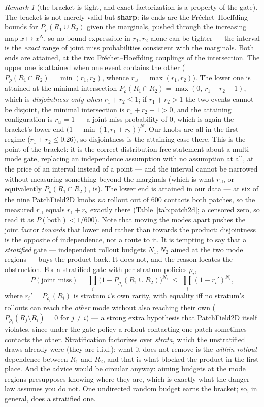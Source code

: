 \documentclass[11pt]{article}
\theoremstyle{definition}
\theoremstyle{remark}
\newtheorem{remark}{Remark}
\begin{document}
\begin{remark}[the bracket is tight, and exact factorization is a property of the gate]
\label{rem:bracket}
The bracket is not merely valid but \textbf{sharp}: its ends are the Fr\'echet--Hoeffding bounds for $P_\rho(R_1 \cup R_2)$ given the marginals, pushed through the increasing map $x \mapsto x^N$, so no bound expressible in $r_1, r_2$ alone can be tighter --- the interval is the \emph{exact} range of joint miss probabilities consistent with the marginals. Both ends are attained, at the two Fr\'echet--Hoeffding couplings of the intersection. The upper one is attained when one event contains the other ($P_\rho(R_1 \cap R_2) = \min(r_1,r_2)$, whence $r_\cup = \max(r_1,r_2)$). The lower one is attained at the minimal intersection $P_\rho(R_1 \cap R_2) = \max(0,\, r_1 + r_2 - 1)$, which is \emph{disjointness only when $r_1 + r_2 \leq 1$}; if $r_1 + r_2 > 1$ the two events cannot be disjoint, the minimal intersection is $r_1 + r_2 - 1 > 0$, and the attaining configuration is $r_\cup = 1$ --- a joint miss probability of $0$, which is again the bracket's lower end $\bigl(1-\min(1, r_1+r_2)\bigr)^N$. Our knobs are all in the first regime ($r_1 + r_2 \leq 0.26$), so disjointness is the attaining case there. This is the point of the bracket: it is the correct distribution-free statement about a multi-mode gate, replacing an independence assumption with no assumption at all, at the price of an interval instead of a point --- and the interval cannot be narrowed without measuring something beyond the marginals (which is what $r_\cup$, or equivalently $P_\rho(R_1 \cap R_2)$, is). The lower end is attained in our data --- at six of the nine PatchField2D knobs \emph{no} rollout out of 600 contacts both patches, so the measured $r_\cup$ equals $r_1 + r_2$ exactly there (Table~\ref{tab:patch2d}; a censored zero, so read it as $P(\text{both}) < 1/600$). Note that moving the modes apart pushes the joint factor \emph{towards} that lower end rather than towards the product: disjointness is the opposite of independence, not a route to it. It is tempting to say that a \emph{stratified} gate --- independent rollout budgets $N_1, N_2$ aimed at the two mode regions --- buys the product back. It does not, and the reason locates the obstruction. For a stratified gate with per-stratum policies $\rho_i$,
\[
  P(\text{joint miss}) = \prod_i \bigl(1 - P_{\rho_i}(R_1 \cup R_2)\bigr)^{N_i} \;\leq\; \prod_i (1-r_i')^{N_i},
\]
where $r_i' = P_{\rho_i}(R_i)$ is stratum $i$'s own rarity, with equality iff no stratum's rollouts can reach the \emph{other} mode without also reaching their own ($P_{\rho_i}(R_j \setminus R_i) = 0$ for $j \neq i$) --- a strong extra hypothesis that PatchField2D itself violates, since under the gate policy a rollout contacting one patch sometimes contacts the other. Stratification factorizes over \emph{strata}, which the unstratified draws already were (they are i.i.d.); what it does not remove is the \emph{within-rollout} dependence between $R_1$ and $R_2$, and that is what blocked the product in the first place. And the advice would be circular anyway: aiming budgets at the mode regions presupposes knowing where they are, which is exactly what the danger law assumes you do not. One undirected random budget earns the bracket; so, in general, does a stratified one.

\end{remark}
\end{document}
